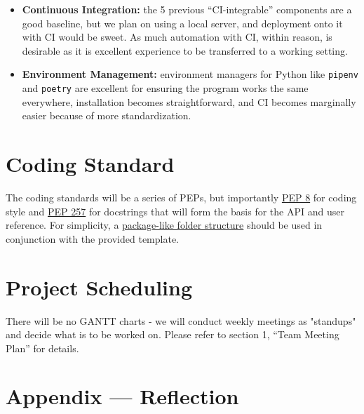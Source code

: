 \documentclass{article}
\begin{document}
\begin{itemize}
    \item \textbf{Continuous Integration:} the 5 previous ``CI-integrable'' components are a good baseline, but we plan on using a local server, and deployment onto it with CI would be sweet. As much automation with CI, within reason, is desirable as it is excellent experience to be transferred to a working setting.
    \item \textbf{Environment Management:} environment managers for Python like \texttt{pipenv} and \texttt{poetry} are excellent for ensuring the program works the same everywhere, installation becomes straightforward, and CI becomes marginally easier because of more standardization.
\end{itemize}

\section{Coding Standard}
The coding standards will be a series of PEPs, but importantly \href{https://peps.python.org/pep-0008/}{PEP 8} for coding style and \href{https://peps.python.org/pep-0257/}{PEP 257} for docstrings that will form the basis for the API and user reference. For simplicity, a \href{https://stackoverflow.com/a/69842362}{package-like folder structure} should be used in conjunction with the provided template.

\section{Project Scheduling}
There will be no GANTT charts - we will conduct weekly meetings as "standups" and decide what is to be worked on. Please refer to section 1, ``Team Meeting Plan'' for details.

\newpage{}

\section*{Appendix --- Reflection}


\end{document}
